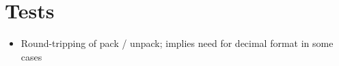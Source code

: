 \documentclass[pdftex,oneside,12pt,a4paper]{book}
\newcommand\linesep{1.68}
\begin{document}
\chapter{Tests}
\begin{itemize}
  \item Round-tripping of pack / unpack; implies need for decimal format in some cases
\end{itemize}

%
%

\end{document}
